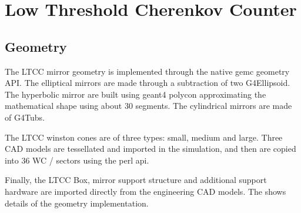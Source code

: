 \section{Low Threshold Cherenkov Counter}


\subsection{Geometry}
The LTCC mirror geometry is implemented through the native gemc geometry API. The elliptical mirrors are made through a subtraction of
two G4Ellipsoid. The hyperbolic mirror are built using geant4 polycon approximating the mathematical shape using about 30 segments.
The cylindrical mirrors are made of G4Tubs.

The LTCC winston cones are of three types: small, medium and large. Three CAD models are tessellated and imported in the simulation, and
then are copied into 36 WC / sectors using the perl api.

Finally, the LTCC Box, mirror support structure and additional support hardware are imported directly from the engineering CAD models.
The  shows details of the geometry implementation.

